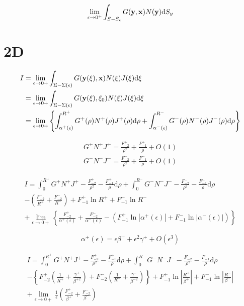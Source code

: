 \documentclass[a4paper,11pt]{article}
\newcommand{\td}{\mathrm{d}}
\begin{document}
\begin{equation}
\lim_{\epsilon\to0^+}\int_{S-S_{\epsilon}} G({\bf y}, {\bf x}) N({\bf y}) \td S_y
\end{equation}

\section{2D}

\begin{align}
I &= \lim_{\epsilon \to 0+} \int_{\Sigma-\Sigma(\epsilon)} G({\bf y}(\xi), {\bf x}) N(\xi) J(\xi) \td \xi \nonumber \\
&= \lim_{\epsilon \to 0+} \int_{\Sigma-\Sigma(\epsilon)} G({\bf y}(\xi), \xi_0) N(\xi) J(\xi) \td \xi \nonumber \\
&= \lim_{\epsilon \to 0+} \left\{ \int_{\alpha^+(\epsilon)}^{R^+} G^+(\rho) N^+(\rho) J^+(\rho) \td \rho +
\int_{\alpha^-(\epsilon)}^{R^-} G^-(\rho) N^-(\rho) J^-(\rho) \td \rho
\right\}
\end{align}

\begin{align}
G^+ N^+ J^+ = \frac{F_{-2}^+}{\rho^2} + \frac{F_{-1}^+}{\rho} + O(1) \nonumber \\
G^- N^- J^- = \frac{F_{-2}^-}{\rho^2} + \frac{F_{-1}^-}{\rho} + O(1)
\end{align}

\begin{multline}
I =
\int_{0}^{R^+} G^+ N^+ J^+ - \frac{F_{-2}^+}{\rho^2} - \frac{F_{-1}^+}{\rho} \td \rho +
\int_{0}^{R^-} G^- N^- J^- - \frac{F_{-2}^-}{\rho^2} - \frac{F_{-1}^-}{\rho} \td \rho \\
-
\left(
\frac{F_{-2}^+}{R^+}
+ \frac{F_{-2}^-}{R^-} 
\right)
+ F_{-1}^+ \ln R^+
+ F_{-1}^- \ln R^- \\
+
\lim_{\epsilon \to 0+}
\left\{
\frac{F_{-2}^+}{\alpha^+(\epsilon)}
+ \frac{F_{-2}^-}{\alpha^-(\epsilon)}
- \left(F_{-1}^+ \ln \left|\alpha^+(\epsilon) \right|
+ F_{-1}^- \ln \left|\alpha^-(\epsilon) \right|\right)
\right\}
\end{multline}

\begin{equation}
\alpha^+(\epsilon) =  \epsilon \beta^+ + \epsilon^2 \gamma^+ + O(\epsilon^3)
\end{equation}

\begin{multline}
I =
\int_{0}^{R^+} G^+ N^+ J^+ - \frac{F_{-2}^+}{\rho^2} - \frac{F_{-1}^+}{\rho} \td \rho +
\int_{0}^{R^-} G^- N^- J^- - \frac{F_{-2}^-}{\rho^2} - \frac{F_{-1}^-}{\rho} \td \rho \\
-
\left\{
F_{-2}^+\left(\frac{1}{R^+} + \frac{\gamma^+}{\beta^{+2}}\right)
+
F_{-2}^-\left(\frac{1}{R^-} + \frac{\gamma^-}{\beta^{-2}}\right)
\right\}
+ F_{-1}^+ \ln \left|\frac{R^+}{\beta^+}\right|
+ F_{-1}^- \ln \left|\frac{R^-}{\beta^-}\right| \\
+
\lim_{\epsilon \to 0+}
\frac{1}{\epsilon}
\left(
\frac{F_{-2}^+}{\beta^+}
+ \frac{F_{-2}^-}{\beta^-}
\right)
\end{multline}
\end{document}
